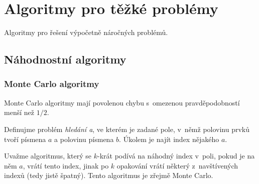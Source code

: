 \section{Algoritmy pro těžké problémy}

Algoritmy pro řešení výpočetně náročných problémů.

\subsection{Náhodnostní algoritmy}

\subsubsection{Monte Carlo algoritmy}

Monte Carlo algoritmy mají povolenou chybu s~omezenou pravděpodobností
menší než $1/2$.

%



\begin{example}
    Definujme problém {\em hledání a}, ve kterém je zadané pole, v~němž
    polovinu prvků tvoří písmena $a$ a polovinu písmena $b$. Úkolem je
    najít index nějakého $a$.

    Uvažme algoritmus, který se $k$-krát podívá na náhodný index v~poli,
    pokud je na něm $a$, vrátí tento index, jinak po $k$ opakování vrátí
    některý z~navštívených indexů (tedy jistě špatný).
    Tento algoritmus je zřejmě Monte Carlo.
\end{example}

